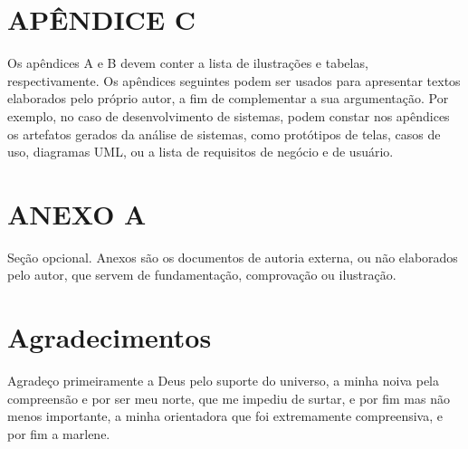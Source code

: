 \documentclass[article,a4paper,12pt,brazil,sumario=tradicional]{abntex2}
\begin{document}
\newpage


\newpage
\renewcommand{\listfigurename}{APÊNDICE A - Lista de ilustrações}
\listoffigures

\newpage
\renewcommand{\listtablename}{APÊNDICE B - Lista de tabelas}
\listoftables

\begin{appendices}
\newpage
\chapter* {APÊNDICE C}
\noindent
Os apêndices A e B devem conter a lista de ilustrações e tabelas, respectivamente. Os apêndices seguintes podem ser usados para apresentar textos elaborados pelo próprio autor, a fim de complementar a sua argumentação. Por exemplo, no caso de desenvolvimento de sistemas, podem constar nos apêndices os artefatos gerados da análise de sistemas, como protótipos de telas, casos de uso, diagramas UML, ou a lista de requisitos de negócio e de usuário.

\newpage
\chapter*{ANEXO A}
\noindent
Seção opcional. Anexos são os documentos de autoria externa, ou não elaborados pelo autor, que servem de fundamentação, comprovação ou ilustração.
\end{appendices}

\newpage
\chapter*{Agradecimentos}
\noindent
Agradeço primeiramente a Deus pelo suporte do universo, a minha noiva pela compreensão e por ser meu norte, que me impediu de surtar, e por fim mas não menos importante, a minha orientadora que foi extremamente compreensiva, e por fim a marlene.
\end{document}
